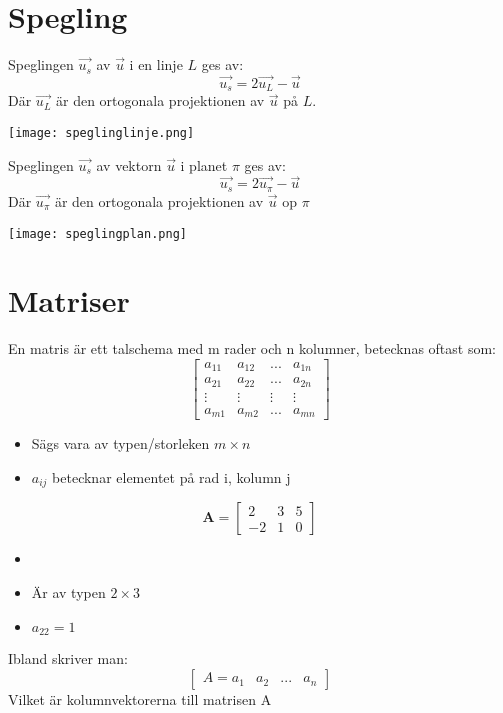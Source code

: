 

\section{Spegling} %
\label{sec:spegling_i_linje}
\begin{Def}
    Speglingen $\vec{u_s}$ av $\vec{u}$	 i en linje $L$ ges av:
    \[
        \vec{u_s} = 2 \vec{u_L} - \vec{u}
    \]
    Där $\vec{u_L}$ är den ortogonala projektionen av $\vec{u}$ på $L$.
    \begin{center}
    	\texttt{[image: speglinglinje.png]}
    \end{center}
\end{Def}
\begin{Def}
    Speglingen $\vec{u_s}$ av vektorn $\vec{u}$ i planet $\pi$ ges av:
    \[
        \vec{u_s} = 2 \vec{u_\pi} - \vec{u} 
    \]
    Där $\vec{u_\pi}$ är den ortogonala projektionen av $\vec{u}$ op $\pi$
    \begin{center}
    	\texttt{[image: speglingplan.png]}
    \end{center}
\end{Def}

\section{Matriser} %
\label{sec:matriser}
En matris är ett talschema med m rader och n kolumner, betecknas oftast som:
\[
    \begin{bmatrix} a_{11} &a_{12} &... &a_{1n}\\a_{21} &a_{22} &... &a_{2n}\\ \vdots &\vdots &\vdots &\vdots\\ a_{m1} &a_{m2} &... &a_{mn} \end{bmatrix}
\]
\begin{itemize}
	\item Sägs vara av typen/storleken $m \times n$
	\item $a_{ij}$ betecknar elementet på rad i, kolumn j
\end{itemize}
\begin{Ex}
    \[
        \mathbf{A} = \begin{bmatrix} 2&3&5\\-2&1&0 \end{bmatrix}
    \]
    \begin{itemize}
    	\item 
    	\item Är av typen $2 \times 3$
    	\item $a_{22} = 1$
    \end{itemize}
\end{Ex}
Ibland skriver man:
\[
    \begin{bmatrix} A = a_1&a_2&...&a_n \end{bmatrix}
\]
Vilket är kolumnvektorerna till matrisen A
